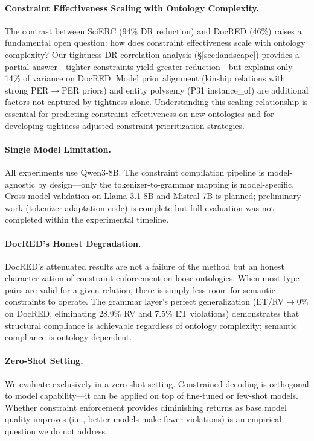 \documentclass[11pt,a4paper]{article}
\begin{document}
\paragraph{Constraint Effectiveness Scaling with Ontology Complexity.}
The contrast between SciERC (94\% DR reduction) and DocRED (46\%) raises a fundamental open question: how does constraint effectiveness scale with ontology complexity?
Our tightness-DR correlation analysis (\S\ref{sec:landscape}) provides a partial answer---tighter constraints yield greater reduction---but explains only 14\% of variance on DocRED.
Model prior alignment (kinship relations with strong PER$\to$PER priors) and entity polysemy (P31 instance\_of) are additional factors not captured by tightness alone.
Understanding this scaling relationship is essential for predicting constraint effectiveness on new ontologies and for developing tightness-adjusted constraint prioritization strategies.

\paragraph{Single Model Limitation.}
All experiments use Qwen3-8B.
The constraint compilation pipeline is model-agnostic by design---only the tokenizer-to-grammar mapping is model-specific.
Cross-model validation on Llama-3.1-8B and Mistral-7B is planned; preliminary work (tokenizer adaptation code) is complete but full evaluation was not completed within the experimental timeline.

\paragraph{DocRED's Honest Degradation.}
DocRED's attenuated results are not a failure of the method but an honest characterization of constraint enforcement on loose ontologies.
When most type pairs are valid for a given relation, there is simply less room for semantic constraints to operate.
The grammar layer's perfect generalization (ET/RV$\to$0\% on DocRED, eliminating 28.9\% RV and 7.5\% ET violations) demonstrates that structural compliance is achievable regardless of ontology complexity; semantic compliance is ontology-dependent.

\paragraph{Zero-Shot Setting.}
We evaluate exclusively in a zero-shot setting.
Constrained decoding is orthogonal to model capability---it can be applied on top of fine-tuned or few-shot models.
Whether constraint enforcement provides diminishing returns as base model quality improves (i.e., better models make fewer violations) is an empirical question we do not address.
\end{document}
